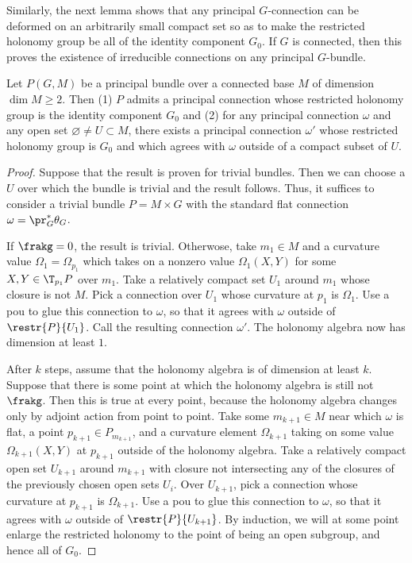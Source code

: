 Similarly, the next lemma shows that any principal $G$-connection can be deformed on an arbitrarily small compact set so as to make the restricted holonomy group be all of the identity component $G_0$. If $G$ is connected, then this proves the existence of irreducible connections on any principal $G$-bundle.

\begin{lem}\label{lem 16.24 McKay}
    Let $P(G,M)$ be a principal bundle over a connected base $M$ of dimension $\dim M\geq 2$. Then (1) $P$ admits a principal connection whose restricted holonomy group is the identity component $G_0$ and (2) for any principal connection $\omega$ and any open set $\varnothing\neq U\subset M$, there exists a principal connection $\omega'$ whose restricted holonomy group is $G_0$ and which agrees with $\omega$ outside of a compact subset of $U$.
\end{lem}
\begin{proof}
    Suppose that the result is proven for trivial bundles. Then we can choose a $U$ over which the bundle is trivial and the result follows. Thus, it suffices to consider a trivial bundle $P=M\times G$ with the standard flat connection $\omega=\pr_G^\ast\theta_G$.

    If $\frakg=0$, the result is trivial. Otherwose, take $m_1\in M$ and a curvature value $\Omega_1=\Omega_{p_1}$ which takes on a nonzero value $\Omega_1(X,Y)$ for some $X,Y\in\T_{p_1}P$ over $m_1$. Take a relatively compact set $U_1$ around $m_1$ whose closure is not $M$. Pick a connection over $U_1$ whose curvature at $p_1$ is $\Omega_1$. Use a \gls{pou} to glue this connection to $\omega$, so that it agrees with $\omega$ outside of $\restr{P}{U_1}$. Call the resulting connection $\omega'$. The holonomy algebra now has dimension at least $1$.

    After $k$ steps, assume that the holonomy algebra is of dimension at least $k$. Suppose that there is some point at which the holonomy algebra is still not $\frakg$. Then this is true at every point, because the holonomy algebra changes only by adjoint action from point to point. Take some $m_{k+1}\in M$ near which $\omega$ is flat, a point $p_{k+1}\in P_{m_{k+1}}$, and a curvature element $\Omega_{k+1}$ taking on some value $\Omega_{k+1}(X,Y)$ at $p_{k+1}$ outside of the holonomy algebra. Take a relatively compact open set $U_{k+1}$ around $m_{k+1}$ with closure not intersecting any of the closures of the previously chosen open sets $U_i$. Over $U_{k+1}$, pick a connection whose curvature at $p_{k+1}$ is $\Omega_{k+1}$. Use a \gls{pou} to glue this connection to $\omega$, so that it agrees with $\omega$ outside of $\restr{P}{U_{k+1}}$. By induction, we will at some point enlarge the restricted holonomy to the point of being an open subgroup, and hence all of $G_0$.
\end{proof}

